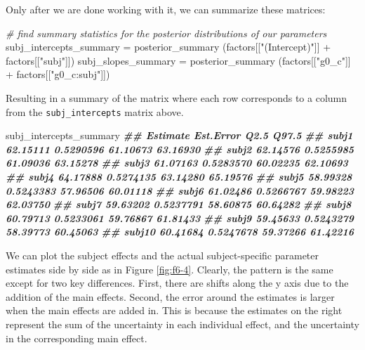 \documentclass[
]{book}
\newenvironment{Shaded}{\begin{snugshade}}{\end{snugshade}}
\newcommand{\CommentTok}[1]{\textcolor[rgb]{0.56,0.35,0.01}{\textit{#1}}}
\newcommand{\DocumentationTok}[1]{\textcolor[rgb]{0.56,0.35,0.01}{\textbf{\textit{#1}}}}
\newcommand{\FunctionTok}[1]{\textcolor[rgb]{0.00,0.00,0.00}{#1}}
\newcommand{\NormalTok}[1]{#1}
\newcommand{\OtherTok}[1]{\textcolor[rgb]{0.56,0.35,0.01}{#1}}
\newcommand{\SpecialCharTok}[1]{\textcolor[rgb]{0.00,0.00,0.00}{#1}}
\newcommand{\StringTok}[1]{\textcolor[rgb]{0.31,0.60,0.02}{#1}}
\begin{document}
Only after we are done working with it, we can summarize these matrices:

\begin{Shaded}
\begin{Highlighting}[]
\CommentTok{\# find summary statistics for the posterior distributions of our parameters}
\NormalTok{subj\_intercepts\_summary }\OtherTok{=} \FunctionTok{posterior\_summary}\NormalTok{ (factors[[}\StringTok{"(Intercept)"}\NormalTok{]] }\SpecialCharTok{+}\NormalTok{ factors[[}\StringTok{"subj"}\NormalTok{]])}
\NormalTok{subj\_slopes\_summary }\OtherTok{=} \FunctionTok{posterior\_summary}\NormalTok{ (factors[[}\StringTok{"g0\_c"}\NormalTok{]] }\SpecialCharTok{+}\NormalTok{ factors[[}\StringTok{"g0\_c:subj"}\NormalTok{]])}
\end{Highlighting}
\end{Shaded}

Resulting in a summary of the matrix where each row corresponds to a column from the \texttt{subj\_intercepts} matrix above.

\begin{Shaded}
\begin{Highlighting}[]
\NormalTok{subj\_intercepts\_summary}
\DocumentationTok{\#\#        Estimate Est.Error     Q2.5    Q97.5}
\DocumentationTok{\#\# subj1  62.15111 0.5290596 61.10673 63.16930}
\DocumentationTok{\#\# subj2  62.14576 0.5255985 61.09036 63.15278}
\DocumentationTok{\#\# subj3  61.07163 0.5283570 60.02235 62.10693}
\DocumentationTok{\#\# subj4  64.17888 0.5274135 63.14280 65.19576}
\DocumentationTok{\#\# subj5  58.99328 0.5243383 57.96506 60.01118}
\DocumentationTok{\#\# subj6  61.02486 0.5266767 59.98223 62.03750}
\DocumentationTok{\#\# subj7  59.63202 0.5237791 58.60875 60.64282}
\DocumentationTok{\#\# subj8  60.79713 0.5233061 59.76867 61.81433}
\DocumentationTok{\#\# subj9  59.45633 0.5243279 58.39773 60.45063}
\DocumentationTok{\#\# subj10 60.41684 0.5247678 59.37266 61.42216}
\end{Highlighting}
\end{Shaded}

We can plot the subject effects and the actual subject-specific parameter estimates side by side as in Figure \ref{fig:f6-4}. Clearly, the pattern is the same except for two key differences. First, there are shifts along the y axis due to the addition of the main effects. Second, the error around the estimates is larger when the main effects are added in. This is because the estimates on the right represent the sum of the uncertainty in each individual effect, and the uncertainty in the corresponding main effect.
\end{document}

